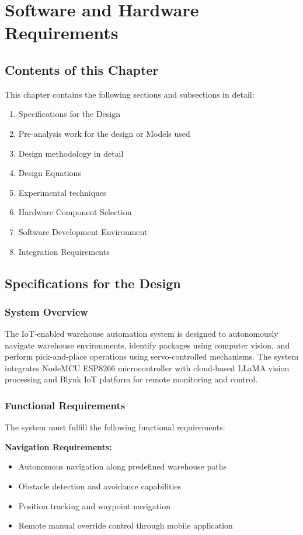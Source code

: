 \chapter{Software and Hardware Requirements}

\section{Contents of this Chapter}
This chapter contains the following sections and subsections in detail:
\begin{enumerate}
\item Specifications for the Design
\item Pre-analysis work for the design or Models used
\item Design methodology in detail
\item Design Equations
\item Experimental techniques
\item Hardware Component Selection
\item Software Development Environment
\item Integration Requirements
\end{enumerate}

\section{Specifications for the Design}

\subsection{System Overview}
The IoT-enabled warehouse automation system is designed to autonomously navigate warehouse environments, identify packages using computer vision, and perform pick-and-place operations using servo-controlled mechanisms. The system integrates NodeMCU ESP8266 microcontroller with cloud-based LLaMA vision processing and Blynk IoT platform for remote monitoring and control.

\subsection{Functional Requirements}
The system must fulfill the following functional requirements:

\textbf{Navigation Requirements:}
\begin{itemize}
\item Autonomous navigation along predefined warehouse paths
\item Obstacle detection and avoidance capabilities
\item Position tracking and waypoint navigation
\item Remote manual override control through mobile application
\end{itemize}

